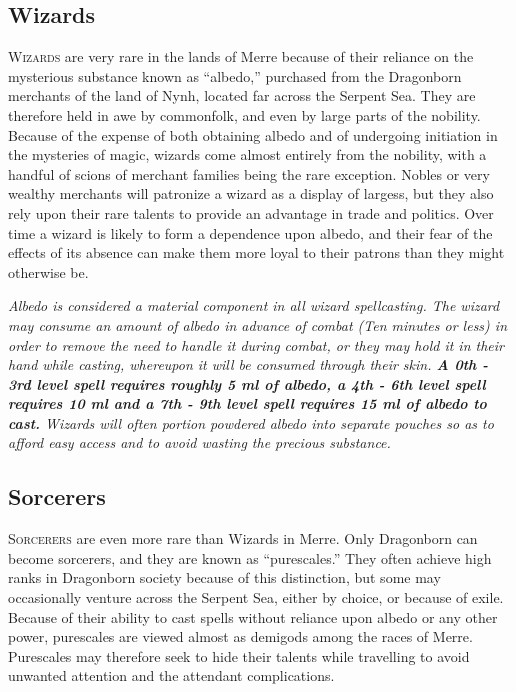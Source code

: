\documentclass[paper=a4, fontsize=11pt]{scrartcl} %
\begin{document}
\begin{multicols}{2}
\subsection{Wizards}

\lettrine[lines=2]{\medievalsharp W}{izards} are very rare in the lands of Merre because of their reliance on the mysterious substance known as ``albedo,'' purchased from the Dragonborn merchants of the land of Nynh, located far across the Serpent Sea. They are therefore held in awe by commonfolk, and even by large parts of the nobility. Because of the expense of both obtaining albedo and of undergoing initiation in the mysteries of magic, wizards come almost entirely from the nobility, with a handful of scions of merchant families being the rare exception. Nobles or very wealthy merchants will patronize a wizard as a display of largess, but they also rely upon their rare talents to provide an advantage in trade and politics. Over time a wizard is likely to form a dependence upon albedo, and their fear of the effects of its absence can make them more loyal to their patrons than they might otherwise be.

\textit{Albedo is considered a material component in all wizard spellcasting. The wizard may consume an amount of albedo in advance of combat (Ten minutes or less) in order to remove the need to handle it during combat, or they may hold it in their hand while casting, whereupon it will be consumed through their skin. \textbf{A 0th - 3rd level spell requires roughly 5 ml of albedo, a 4th - 6th level spell requires 10 ml and a 7th - 9th level spell requires 15 ml of albedo to cast.} Wizards will often portion powdered albedo into separate pouches so as to afford easy access and to avoid wasting the precious substance.}

\subsection{Sorcerers}

\lettrine[lines=2]{\medievalsharp S}{orcerers} are even more rare than Wizards in Merre. Only Dragonborn can become sorcerers, and they are known as ``purescales.'' They often achieve high ranks in Dragonborn society because of this distinction, but some may occasionally venture across the Serpent Sea, either by choice, or because of exile. Because of their ability to cast spells without reliance upon albedo or any other power, purescales are viewed almost as demigods among the races of Merre. Purescales may therefore seek to hide their talents while travelling to avoid unwanted attention and the attendant complications.


\end{multicols}
\end{document}
